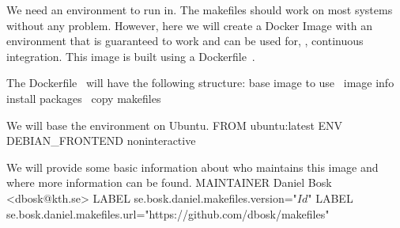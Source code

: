 We need an environment to run in.%
The makefiles should work on most systems without any problem.
However, here we will create a Docker Image with an environment that is 
guaranteed to work and can be used for, \eg, continuous integration.
This image is built using a {\Tt{}\LA{}Dockerfile~{\nwtagstyle{}}\RA{}\nwendquote}.

The {\Tt{}\LA{}Dockerfile~{\nwtagstyle{}}\RA{}\nwendquote} will have the following structure:
\endmoddef\nwstartdeflinemarkup\nwenddeflinemarkup
\LA{}base image to use~{\nwtagstyle{}}\RA{}
\LA{}image info~{\nwtagstyle{}}\RA{}
\LA{}install packages~{\nwtagstyle{}}\RA{}
\LA{}copy makefiles~{\nwtagstyle{}}\RA{}
\nwendcode{}\nwdocspar

We will base the environment on Ubuntu.
\nwenddocs{}\endmoddef\nwstartdeflinemarkup{}\nwenddeflinemarkup
FROM ubuntu:latest
ENV DEBIAN_FRONTEND noninteractive
\nwendcode{}\nwdocspar

We will provide some basic information about who maintains this image and where 
more information can be found.
\nwenddocs{}\endmoddef\nwstartdeflinemarkup{}\nwenddeflinemarkup
MAINTAINER Daniel Bosk <dbosk@kth.se>
LABEL se.bosk.daniel.makefiles.version="$Id$"
LABEL se.bosk.daniel.makefiles.url="https://github.com/dbosk/makefiles"
\nwendcode{}\nwdocspar


